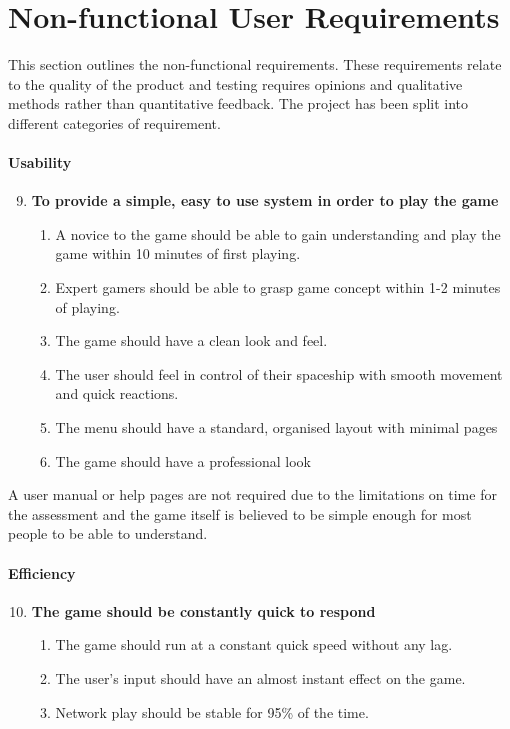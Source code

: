 \section{Non-functional User Requirements}
\label{sec: non-functional}

This section outlines the non-functional requirements. These requirements relate to the quality of the product and testing requires opinions and qualitative methods rather than quantitative feedback. The project has been split into different categories of requirement.

\paragraph{Usability} 
\begin{enumerate}
\setcounter{enumi}{8}
\item \textbf{To provide a simple, easy to use system in order to play the game}
\begin{enumerate}
\item A novice to the game should be able to gain understanding and play the game within 10 minutes of first playing.
\item Expert gamers should be able to grasp game concept within 1-2 minutes of playing.
\item The game should have a clean look and feel.
\item The user should feel in control of their spaceship with smooth movement and quick reactions.
\item The menu should have a standard, organised layout with minimal pages
\item The game should have a professional look
\end{enumerate}
\end{enumerate}
A user manual or help pages are not required due to the limitations on time for the assessment and the game itself is believed to be simple enough for most people to be able to understand.

\paragraph{Efficiency}
\begin{enumerate}
\setcounter{enumi}{9}
\item \textbf{The game should be constantly quick to respond}
\begin{enumerate}
\item The game should run at a constant quick speed without any lag.
\item The user's input should have an almost instant effect on the game.
\item Network play should be stable for 95\% of the time.
\end{enumerate}
\end{enumerate}

